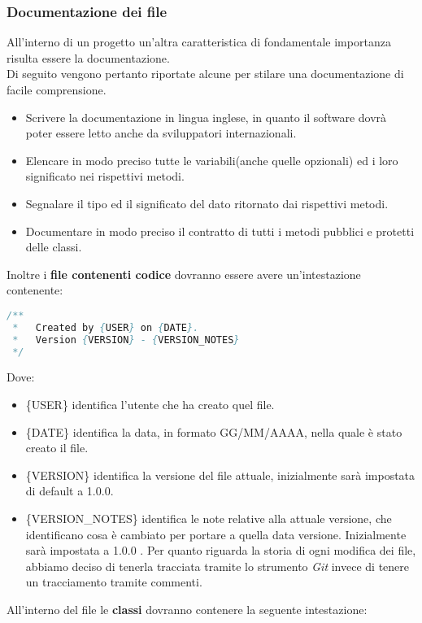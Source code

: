 \subsubsection{Documentazione dei file}
All'interno di un progetto  un'altra caratteristica di fondamentale importanza risulta essere la documentazione. \\
Di seguito vengono pertanto riportate alcune  per stilare una documentazione di facile comprensione.

\begin{itemize}
\item Scrivere la documentazione in lingua inglese, in quanto il software dovrà poter essere letto anche da sviluppatori internazionali.
\item Elencare in modo preciso tutte le variabili(anche quelle opzionali) ed i loro significato nei rispettivi metodi.
\item Segnalare il tipo ed il significato del dato ritornato dai rispettivi metodi.
\item Documentare in modo preciso il contratto di tutti i metodi pubblici e protetti delle classi.
\end{itemize}
Inoltre i \textbf{file contenenti codice} dovranno essere avere un’intestazione contenente:

\begin{lstlisting}[language=Java]
/** 
 *   Created by {USER} on {DATE}.
 *   Version {VERSION} - {VERSION_NOTES}
 */
\end{lstlisting}
Dove:
\begin{itemize}
\item \{USER\} identifica l'utente che ha creato quel file.
\item \{DATE\} identifica la data, in formato GG/MM/AAAA, nella quale è stato creato il file.
\item \{VERSION\} identifica la versione del file attuale, inizialmente sarà impostata di default a 1.0.0.
\item \{VERSION\_NOTES\} identifica le note relative alla attuale versione, che identificano cosa è cambiato per portare a quella data versione. Inizialmente sarà impostata a 1.0.0 .
Per quanto riguarda la storia di ogni modifica dei file, abbiamo deciso di tenerla tracciata tramite lo strumento \textit{Git} invece di tenere un tracciamento tramite commenti.
\end{itemize}



All'interno del file le \textbf{classi} dovranno contenere la seguente intestazione:

